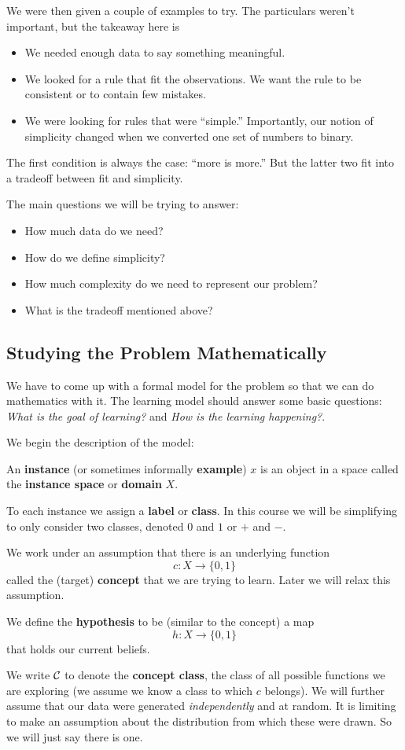 \documentclass[12pt]{article}
\begin{document}
We were then given a couple of examples to try. The particulars weren't important, but the takeaway here is 
\begin{itemize}
	\item We needed enough data to say something meaningful.
	\item We looked for a rule that fit the observations. We want the rule to be consistent or to contain few mistakes.
	\item We were looking for rules that were ``simple.'' Importantly, our notion of simplicity changed when we converted one set of numbers to binary.
\end{itemize}
The first condition is always the case: ``more is more.'' But the latter two fit into a tradeoff between fit and simplicity.

The main questions we will be trying to answer:
\begin{itemize}
	\item How much data do we need?
	\item How do we define simplicity?
	\item How much complexity do we need to represent our problem?
	\item What is the tradeoff mentioned above?
\end{itemize}

\subsection{Studying the Problem Mathematically}
We have to come up with a formal model for the problem so that we can do mathematics with it. The learning model should answer some basic questions:
\textit{What is the goal of learning?} and \textit{How is the learning happening?}.

We begin the description of the model:
\begin{defn}
	An \textbf{instance} (or sometimes informally \textbf{example}) $x$ is an object in a space called the \textbf{instance space} or \textbf{domain} $X$.
\end{defn}
\begin{rmk}
	To each instance we assign a \textbf{label} or \textbf{class}. In this course we will be simplifying to only consider two classes, denoted $0$ and $1$ or $+$ and $-$.
\end{rmk}
\begin{rmk}
	We work under an assumption that there is an underlying function 
	\[c:X\to\{0,1\}\]
	called the (target) \textbf{concept} that we are trying to learn. Later we will relax this assumption.
\end{rmk}
\begin{defn}
	We define the \textbf{hypothesis} to be (similar to the concept) a map 
	\[h:X\to\{0,1\}\]
	that holds our current beliefs.
\end{defn}
We write $\mathcal{C}$ to denote the \textbf{concept class}, the class of all possible functions we are exploring (we assume we know a class to which $c$ belongs). We will further 
assume that our data were generated \textit{independently} and at random. It is limiting to make an assumption about the distribution from which these were drawn. So we will just say there is one.
\end{document}
